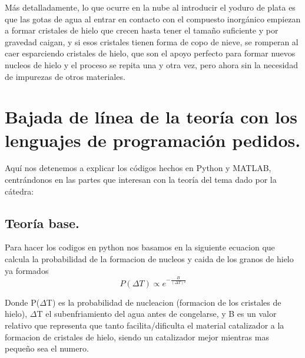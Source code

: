 \documentclass[12pt,a4paper]{article}
\begin{document}
Más detalladamente, lo que ocurre en la nube al introducir el yoduro de plata es que las gotas de agua al entrar en contacto con el compuesto inorgánico empiezan a formar cristales de hielo que crecen hasta tener el tamaño suficiente y por gravedad caigan, y si esos cristales tienen forma de copo de nieve, se romperan al caer esparciendo cristales de hielo, que son el apoyo perfecto para formar nuevos nucleos de hielo y el proceso se repita una y otra vez, pero ahora sin la necesidad de impurezas de otros materiales.

\section{Bajada de línea de la teoría con los lenguajes de programación pedidos.}
Aquí nos detenemos a explicar los códigos hechos en Python y MATLAB, centrándonos en las partes que interesan con la teoría del tema dado por la cátedra:
 
\subsection{Teoría base.}
Para hacer los codigos en python nos basamos en la siguiente ecuacion que calcula la probabilidad de la formacion de nucleos y caida de los granos de hielo ya formados
\begin{equation}
    P(\Delta T) \propto  e^{-\frac{B}{(\Delta T)²} }
\end{equation}

Donde P($\Delta$T) es la probabilidad de nucleacion (formacion de los cristales
de hielo), $\Delta$T el subenfriamiento del agua antes de congelarse, y B es un
valor relativo que representa que tanto facilita/dificulta el material
catalizador a la formacion de cristales de hielo, siendo un catalizador mejor
mientras mas pequeño sea el numero.
\end{document}

